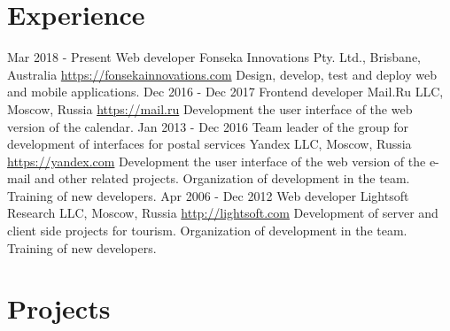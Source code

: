 \documentclass[11pt,a4paper]{moderncv}
\begin{document}
\newpage

\section{Experience}
\cventry
  {Mar 2018 - Present}
  {Web developer}
  {Fonseka Innovations Pty. Ltd., Brisbane, Australia}
  {\newline{}\url{https://fonsekainnovations.com}}{}
  {Design, develop, test and deploy web and mobile applications.}
\cventry
  {Dec 2016 - Dec 2017}
  {Frontend developer}
  {Mail.Ru LLC, Moscow, Russia}
  {\newline{}\url{https://mail.ru}}{}
  {Development the user interface of the web version of the calendar.}
\cventry
  {Jan 2013 - Dec 2016}
  {Team leader of the group for development of interfaces for postal services}
  {Yandex LLC, Moscow, Russia}
  {\newline{}\url{https://yandex.com}}{}
  {Development the user interface of the web version of the e-mail and other related projects.
  Organization of development in the team.\newline{}
  Training of new developers.}
\cventry
  {Apr 2006 - Dec 2012}
  {Web developer}
  {Lightsoft Research LLC, Moscow, Russia}
  {\newline{}\url{http://lightsoft.com}}{}
  {Development of server and client side projects for tourism.\newline{}
  Organization of development in the team.\newline{}
  Training of new developers.}

\section{Projects}
\end{document}
